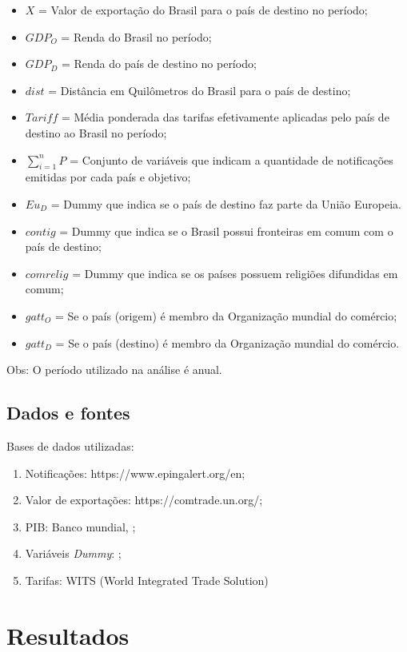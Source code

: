 \documentclass[12pt, a4paper]{article}
\begin{document}
\begin{itemize}
    \item $X$ = Valor de exportação do Brasil para o país de destino no período;
    \item $GDP_{O}$ = Renda do Brasil no período;
    \item $GDP_{D}$ = Renda do país de destino no período;
    \item $dist$ = Distância em Quilômetros  do Brasil para o país de destino;
    \item $Tariff$ = Média ponderada das tarifas efetivamente aplicadas pelo país de destino ao Brasil no período;
    \item $\sum_{i=1}^{n} P$ = Conjunto de variáveis que indicam a quantidade de notificações emitidas por cada país e objetivo;
    \item $Eu_{D}$ = Dummy que indica se o país de destino faz parte da União Europeia.
    \item $contig$ = Dummy que indica se o Brasil possui fronteiras em comum com o país de destino;
    \item $comrelig$ = Dummy que indica se os países possuem religiões difundidas em comum;
    \item $gatt_O$ = Se o país (origem) é membro da Organização mundial do comércio;
    \item $gatt_D$ = Se o país (destino) é membro da Organização mundial do comércio.
\end{itemize}

Obs: O período utilizado na análise é anual.

\subsection{Dados e fontes}

Bases de dados utilizadas:

\begin{enumerate}
    \item Notificações: https://www.epingalert.org/en;
    \item Valor de exportações: https://comtrade.un.org/;
    \item PIB: Banco mundial, \cite{WB};
    \item Variáveis \emph{Dummy}: \cite{CEPII};
    \item Tarifas: WITS (World Integrated Trade Solution)
\end{enumerate}

\newpage
\section{Resultados}
\end{document}
